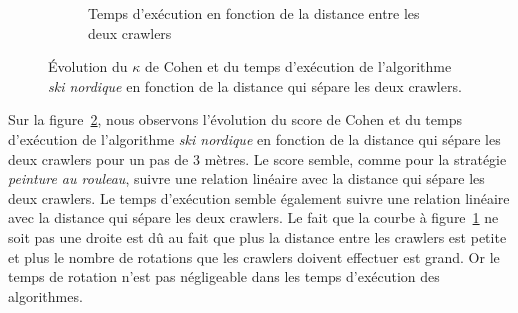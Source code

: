 \documentclass[english,RandD]{rapportPFE}  %
\begin{document}
\begin{figure}[h!]
\begin{subfigure}[t]{0.49\linewidth}
						\caption{Temps d'exécution en fonction de la distance entre les deux crawlers}
						\label{fig:ski_nordique-time_vs_distance}
				\end{subfigure}
				\caption{Évolution du $\kappa$ de Cohen et du temps d'exécution de l'algorithme \textit{ski nordique} en fonction de la distance qui sépare les deux crawlers.}
				\label{fig:ski_nordique-distance}
			\end{figure}

			Sur la figure~\ref{fig:ski_nordique-distance}, nous observons l'évolution du score de Cohen et du temps d'exécution de l'algorithme \textit{ski nordique} en fonction de la distance qui sépare les deux crawlers pour un pas de 3 mètres.
			Le score semble, comme pour la stratégie \textit{peinture au rouleau}, suivre une relation linéaire avec la distance qui sépare les deux crawlers.
			Le temps d'exécution semble également suivre une relation linéaire avec la distance qui sépare les deux crawlers.
			Le fait que la courbe à figure~\ref{fig:ski_nordique-time_vs_distance} ne soit pas une droite est dû au fait que plus la distance entre les crawlers est petite et plus le nombre de rotations que les crawlers doivent effectuer est grand.
			Or le temps de rotation n'est pas négligeable dans les temps d'exécution des algorithmes.
\end{document}

